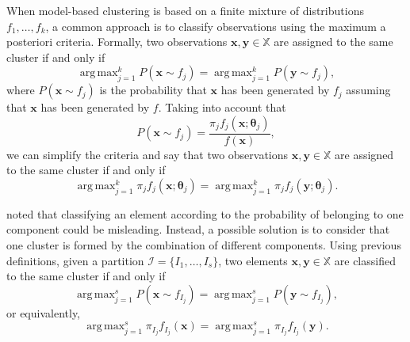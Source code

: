 \documentclass[10pt, a4paper]{article}
\DeclareMathOperator*{\argmax}{arg\,max}
\newcommand{\m}[1]{\boldsymbol{#1}}
\begin{document}
When model-based clustering is based on a finite mixture of distributions $f_1, \dots, f_k$, a common approach is to classify observations using the maximum a posteriori criteria. Formally, two observations $\m x, \m y \in \mathbb{X}$ are assigned to the same cluster if and only if 
\[
\argmax_{j=1}^k P(\m x \sim f_j) = \argmax_{j=1}^k P(\m y \sim f_j),
\]
where $P(\m x \sim f_j)$ is the probability that $\m x$ has been generated by $f_j$ assuming that $\m x$ has been generated by $f$. Taking into account that
\[
P(\m x \sim f_j) = \frac{\pi_j f_j(\m x ; \m\theta_j) }{f(\m x)},
\]
we can simplify the criteria and say that two observations $\m x, \m y \in \mathbb{X}$ are assigned to the same cluster if and only if 
\[
\argmax_{j=1}^k \pi_j f_j(\m x ; \m\theta_j) = \argmax_{j=1}^k \pi_j f_j(\m y ; \m\theta_j).
\]


\cite{lee2004combining,hennig2010methods,baudry2010combining,melnykov2013distribution,pastore2013merging} noted that classifying an element according to the probability of belonging to one component could be misleading. Instead, a possible solution is to consider that one cluster is formed by the combination of different components. Using previous definitions, given a partition $\mathcal{I} = \{ I_1, \dots, I_s\}$, two elements $\m x, \m y \in \mathbb{X}$ are classified to the same cluster if and only if
\[
\argmax_{j=1}^s P(\m x \sim f_{I_j}) = \argmax_{j=1}^s P(\m y \sim f_{I_j}),
\]
or equivalently,
\[
\argmax_{j=1}^s \pi_{I_j} f_{I_j}(\m x) = \argmax_{j=1}^s \pi_{I_j} f_{I_j}(\m y).
\]



\end{document}
